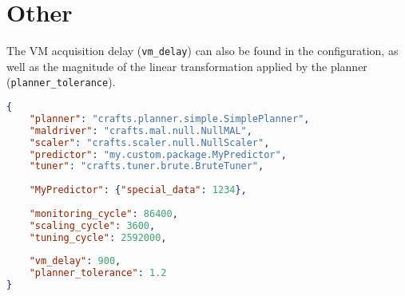 \section{Other}
The VM acquisition delay (\texttt{vm\_delay}) can also be found in the configuration, as well as the magnitude of the linear transformation applied by the \textsf{planner} (\texttt{planner\_tolerance}).

\begin{lstlisting}[language=json]
{
    "planner": "crafts.planner.simple.SimplePlanner",
    "maldriver": "crafts.mal.null.NullMAL",
    "scaler": "crafts.scaler.null.NullScaler",
    "predictor": "my.custom.package.MyPredictor",
    "tuner": "crafts.tuner.brute.BruteTuner",
    
    "MyPredictor": {"special_data": 1234},
    
    "monitoring_cycle": 86400,
    "scaling_cycle": 3600,
    "tuning_cycle": 2592000,
    
    "vm_delay": 900,
    "planner_tolerance": 1.2
}
\end{lstlisting}